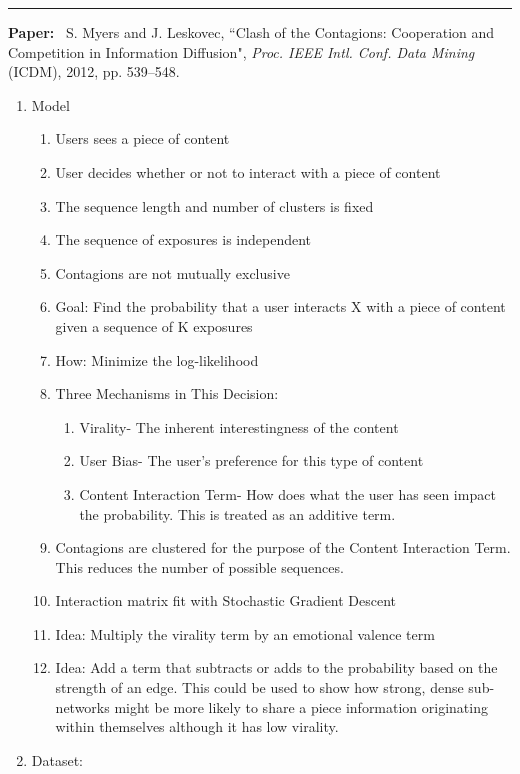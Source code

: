 \documentclass[11pt]{article}
\begin{document}
\noindent
\rule{\textwidth}{0.01in}
\textbf{Paper:}~ 
S. Myers and J. Leskovec, ``Clash of the Contagions: Cooperation and
Competition in Information Diffusion", \emph{Proc. IEEE Intl. Conf. Data Mining}
(ICDM), 2012, pp. 539--548.

\begin{enumerate}
    \item Model 
    \begin{enumerate}
        \item Users sees a piece of content
        \item User decides whether or not to interact with a piece of content
        \item The sequence length and number of clusters is fixed
        \item The sequence of exposures is independent
        \item Contagions are not mutually exclusive
        \item Goal: Find the probability that a user interacts X with a piece of content given a sequence of K exposures
         \item How: Minimize the log-likelihood
        \item Three Mechanisms in This Decision: 
        \begin{enumerate}
            \item Virality- The inherent interestingness of the content
            \item User Bias- The user's preference for this type of content
            \item Content Interaction Term- How does what the user has seen impact the probability. This is treated as an additive term.
        \end{enumerate}
        \item Contagions are clustered for the purpose of the Content Interaction Term. This reduces the number of possible sequences.
        \item Interaction matrix fit with Stochastic Gradient Descent
        \item Idea: Multiply the virality term by an emotional valence term 
        \item Idea: Add a term that subtracts or adds to the probability based on the strength of an edge. This could be used to show how strong, dense sub-networks might be more likely to share a piece information originating within themselves although it has low virality.
    \end{enumerate}
    \item Dataset:

\end{enumerate}
\end{document}
